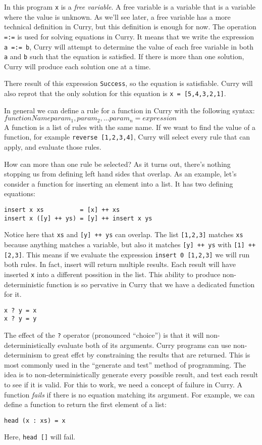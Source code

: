 In this program \texttt x is a \textit{free variable}.
A free variable is a variable that is a variable where the value is unknown.
As we'll see later, a free variable has a more technical definition in Curry,
but this definition is enough for now.
The operation \texttt{=:=} is used for solving equations in Curry.
It means that we write the expression \texttt{a =:= b}, Curry will attempt
to determine the value of each free variable in both \texttt a and \texttt b
such that the equation is satisfied.
If there is more than one solution, Curry will produce each solution one at a time.

There result of this expression \texttt{Success}, so the equation is satisfiable.
Curry will also reprot that the only solution for this equation is
\texttt{x = [5,4,3,2,1]}.


In general we can define a rule for a function in Curry with the following syntax:\\
$functionName param_1, param_2, \ldots param_n = expression$\\
A function is a list of rules with the same name.
If we want to find the value of a function, for example \texttt{reverse [1,2,3,4]},
Curry will select every rule that can apply, and evaluate those rules.

How can more than one rule be selected?
As it turns out, there's nothing stopping us from defining left hand sides that overlap.
As an example, let's consider a function for inserting an element into a list.
It has two defining equations:

\begin{verbatim}
insert x xs          = [x] ++ xs
insert x ([y] ++ ys) = [y] ++ insert x ys
\end{verbatim}

Notice here that \texttt{xs} and \texttt{[y] ++ ys} can overlap.
The list \texttt{[1,2,3]} matches \texttt{xs} because anything matches a variable,
but also it matches \texttt{[y] ++ ys} with \texttt{[1] ++ [2,3]}.
This means if we evaluate the expression \texttt{insert 0 [1,2,3]} we will run both rules.
In fact, insert will return multiple results.
Each result will have inserted \texttt x into a different possition in the list.
This ability to produce non-deterministic function is so pervative in Curry that we have a dedicated function for it.
\begin{verbatim}
x ? y = x
x ? y = y
\end{verbatim}

The effect of the \texttt ? operator (pronounced ``choice'') is that it will non-deterministically evaluate both of its arguments.
Curry programs can use non-determinism to great effct by constraining the results that are returned.
This is most commonly used in the ``generate and test'' method of programming.
The idea is to non-deterministically generate every possible result, and test each result to see if it is valid.
For this to work, we need a concept of failure in Curry.
A function \textit{fails} if there is no equation matching its argument.
For example, we can define a function to return the first element of a list:
\begin{verbatim}
head (x : xs) = x
\end{verbatim}
Here, \texttt{head []} will fail.

